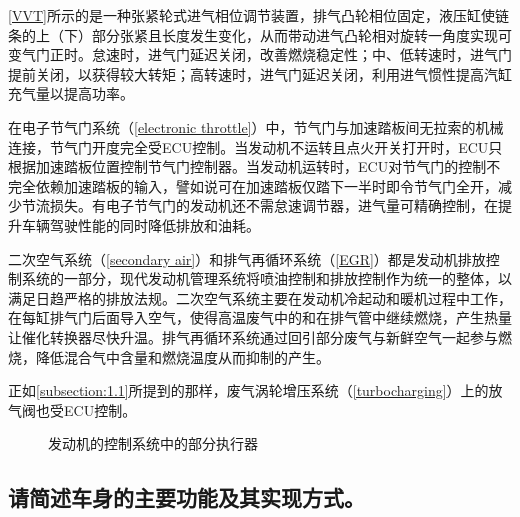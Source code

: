 \documentclass[UTF8]{ctexart}
\numberwithin{figure}{section}
\numberwithin{table}{section}
\begin{document}
\cref{VVT}所示的是一种张紧轮式进气相位调节装置，排气凸轮相位固定，液压缸使链条的上（下）部分张紧且长度发生变化，从而带动进气凸轮相对旋转一角度实现可变气门正时。怠速时，进气门延迟关闭，改善燃烧稳定性；中、低转速时，进气门提前关闭，以获得较大转矩；高转速时，进气门延迟关闭，利用进气惯性提高汽缸充气量以提高功率。

在电子节气门系统（\cref{electronic throttle}）中，节气门与加速踏板间无拉索的机械连接，节气门开度完全受ECU控制。当发动机不运转且点火开关打开时，ECU只根据加速踏板位置控制节气门控制器。当发动机运转时，ECU对节气门的控制不完全依赖加速踏板的输入，譬如说可在加速踏板仅踏下一半时即令节气门全开，减少节流损失。有电子节气门的发动机还不需怠速调节器，进气量可精确控制，在提升车辆驾驶性能的同时降低排放和油耗。

二次空气系统（\cref{secondary air}）和排气再循环系统（\cref{EGR}）都是发动机排放控制系统的一部分，现代发动机管理系统将喷油控制和排放控制作为统一的整体，以满足日趋严格的排放法规。二次空气系统主要在发动机冷起动和暖机过程中工作，在每缸排气门后面导入空气，使得高温废气中的和在排气管中继续燃烧，产生热量让催化转换器尽快升温。排气再循环系统通过回引部分废气与新鲜空气一起参与燃烧，降低混合气中含量和燃烧温度从而抑制的产生。

正如\cref{subsection:1.1}所提到的那样，废气涡轮增压系统（\cref{turbocharging}）上的放气阀也受ECU控制。

\begin{figure}[htbp]
	\centering
	\caption{发动机的控制系统中的部分执行器}
	\label{actuators}
\end{figure}

\subsection{请简述车身的主要功能及其实现方式。}
\end{document}
